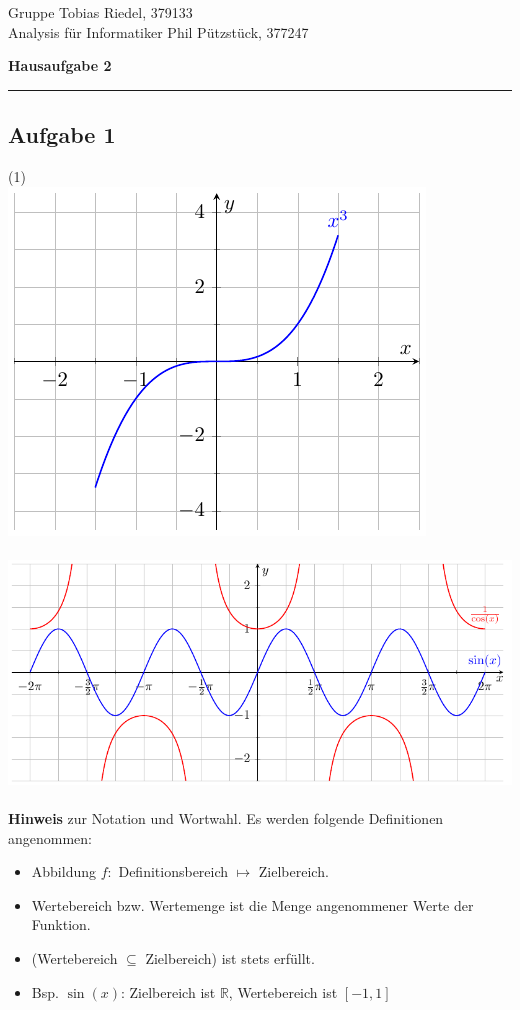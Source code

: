 \documentclass[a4paper,graphics,11pt]{article}
\newcommand\aufgabe[1]{\subsection*{Aufgabe #1}}
\begin{document}
\noindent Gruppe              \hfill Tobias Riedel, 379133 \\
\noindent Analysis für Informatiker             \hfill Phil Pützstück, 377247 \\

\begin{center}
	\LARGE{\textbf{Hausaufgabe 2}}
\end{center}
\begin{center}
\rule[0.1ex]{\textwidth}{1pt}
\end{center}



\aufgabe{1}
\begin{tasks}(1)
    \task \\ \includegraphics{graphics/graph0.pdf}
        \\ \\ \includegraphics{graphics/graph1.pdf}\\\\
        \textbf{Hinweis} zur Notation und Wortwahl.
        Es werden folgende Definitionen angenommen:
        \begin{itemize}
            \item Abbildung $f \colon $ Definitionsbereich $\mapsto$ Zielbereich.
            \item Wertebereich bzw. Wertemenge ist die Menge angenommener Werte der Funktion.
            \item (Wertebereich $\subseteq$ Zielbereich)
                ist stets erfüllt.
            \item Bsp. $\sin(x)$: Zielbereich ist $\mathbb{R}$, Wertebereich ist $[-1,1]$
        \end{itemize}



\end{tasks}
\end{document}

